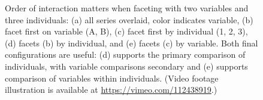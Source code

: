 \documentclass[12pt]{article}
\begin{document}
\begin{center}
\begin{figure}[htp]
\caption{\label{fig:faceting-var-ind}Order of interaction matters when faceting with two variables and three individuals: (a) all series overlaid, color indicates variable, (b) facet first on variable (A, B),  (c) facet first by individual (1, 2, 3), (d) facets (b) by individual, and (e) facets (c) by variable. Both final configurations are useful: (d) supports the primary comparison of individuals, with variable comparisons secondary and (e) supports comparison of variables within individuals.  (Video footage illustration is available at \url{https://vimeo.com/112438919}.)}
\end{figure}

\end{center}




\end{document}
